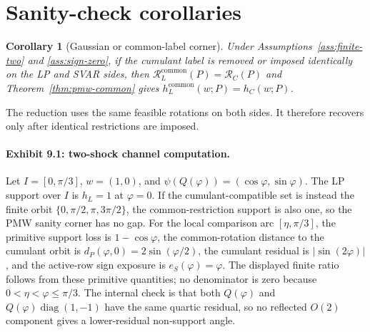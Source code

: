 \documentclass[11pt]{article}
\theoremstyle{definition}
\theoremstyle{plain}
\newtheorem{corollary}{Corollary}
\theoremstyle{remark}
\begin{document}
\section{Sanity-check corollaries}
\begin{corollary}[Gaussian or common-label corner]\label{cor:pmw-corner}
Under Assumptions~\ref{ass:finite-two} and \ref{ass:sign-zero}, if the cumulant label is removed or imposed identically on the LP and SVAR sides, then \(\mathcal R_L^{\mathrm{common}}(P)=\mathcal R_C(P)\) and Theorem~\ref{thm:pmw-common} gives \(h_L^{\mathrm{common}}(w;P)=h_C(w;P)\).
\end{corollary}
The reduction uses the same feasible rotations on both sides. It therefore recovers \citet{PlagborgMollerWolf2021} only after identical restrictions are imposed.

\paragraph{Exhibit 9.1: two-shock channel computation.}
Let \(I=[0,\pi/3]\), \(w=(1,0)\), and \(\psi(Q(\varphi))=(\cos\varphi,\sin\varphi)\). The LP support over \(I\) is \(h_L=1\) at \(\varphi=0\). If the cumulant-compatible set is instead the finite orbit \(\{0,\pi/2,\pi,3\pi/2\}\), the common-restriction support is also one, so the PMW sanity corner has no gap. For the local comparison arc \([\eta,\pi/3]\), the primitive support loss is \(1-\cos\varphi\), the common-rotation distance to the cumulant orbit is \(d_P(\varphi,0)=2\sin(\varphi/2)\), the cumulant residual is \(|\sin(2\varphi)|\), and the active-row sign exposure is \(e_S(\varphi)=\varphi\). The displayed finite ratio follows from these primitive quantities; no denominator is zero because \(0<\eta<\varphi\le\pi/3\). The internal check is that both \(Q(\varphi)\) and \(Q(\varphi)\operatorname{diag}(1,-1)\) have the same quartic residual, so no reflected \(O(2)\) component gives a lower-residual non-support angle.
\end{document}
